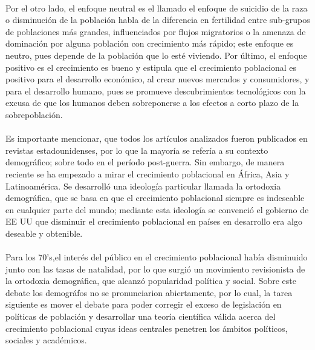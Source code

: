 \documentclass[11pt,spanish,letterpaper]{article}
\theoremstyle{plain}
\begin{document}
\\
Por el otro lado, el enfoque neutral es el llamado el enfoque de suicidio de la raza o disminuci\'on de la poblaci\'on habla de la diferencia en fertilidad entre sub-grupos de poblaciones m\'as grandes, influenciados por flujos migratorios o la amenaza de dominaci\'on por alguna poblaci\'on con crecimiento m\'as r\'apido; este enfoque es neutro, pues depende de la poblaci\'on que lo est\'e viviendo. Por \'ultimo, el enfoque positivo es el crecimiento es bueno y estipula que el crecimiento poblacional es positivo para el desarrollo econ\'omico, al crear nuevos mercados y consumidores, y  para el desarrollo humano, pues se promueve descubrimientos tecnol\'ogicos con la excusa de que los humanos deben sobreponerse a los efectos a corto plazo de la sobrepoblaci\'on.\\
\\
Es importante mencionar, que todos los art\'iculos analizados fueron publicados en revistas estadounidenses, por lo que la mayor\'ia se refer\'ia a su contexto demogr\'afico; sobre todo en el per\'iodo post-guerra. Sin embargo, de manera reciente se ha empezado a mirar el crecimiento poblacional en \'Africa, Asia y Latinoam\'erica. Se desarroll\'o una ideolog\'ia particular llamada la ortodoxia demogr\'afica, que se basa en que el crecimiento poblacional siempre es indeseable en cualquier parte del mundo; mediante esta ideolog\'ia se convenci\'o el gobierno de EE UU que disminuir el crecimiento poblacional en pa\'ises en desarrollo era algo deseable y obtenible.\\
\\
Para los 70's,el inter\'es del p\'ublico en el crecimiento poblacional hab\'ia disminuido junto con las tasas de natalidad, por lo que surgi\'o un movimiento revisionista de la ortodoxia demogr\'afica, que alcanz\'o popularidad pol\'itica y social. Sobre este debate los demogr\'afos no se pronunciarion abiertamente, por lo cual, la tarea siguiente es mover el debate para poder corregir el exceso de legislaci\'on en pol\'iticas de poblaci\'on y desarrollar una teor\'ia cient\'ifica v\'alida acerca del crecimiento poblacional cuyas ideas centrales penetren los \'ambitos pol\'iticos, sociales y acad\'emicos.


\end{document}

